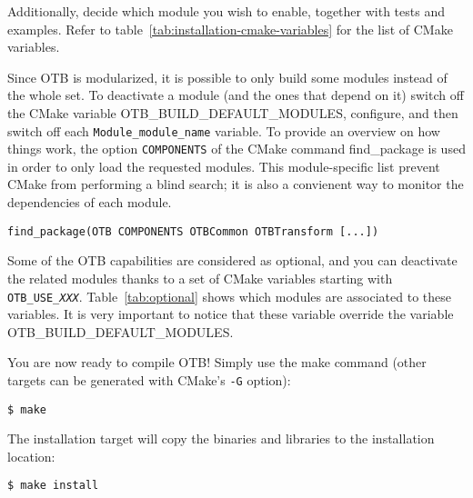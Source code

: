 Additionally, decide which module you wish to enable, together with tests and
examples.  Refer to table~\ref{tab:installation-cmake-variables} for the list of
CMake variables.

Since OTB is modularized, it is possible to only build some modules instead of
the whole set.  To deactivate a module (and the ones that depend on it) switch
off the CMake variable OTB\_BUILD\_DEFAULT\_MODULES, configure, and then switch
off each \texttt{Module\_module\_name} variable.  To provide an overview on how
things work, the option \texttt{COMPONENTS} of the CMake command find\_package
is used in order to only load the requested modules.  This module-specific list
prevent CMake from performing a blind search; it is also a convienent way to
monitor the dependencies of each module.
\begin{verbatim}
find_package(OTB COMPONENTS OTBCommon OTBTransform [...])
\end{verbatim} 

Some of the OTB capabilities are considered as optional, and you can deactivate
the related modules thanks to a set of CMake variables starting
with \texttt{OTB\_USE\_\textit{XXX}}.  Table~\ref{tab:optional} shows which
modules are associated to these variables. It is very important to notice that
these variable override the variable OTB\_BUILD\_DEFAULT\_MODULES.

You are now ready to compile OTB!  Simply use the make command (other targets
can be generated with CMake's \texttt{-G} option):
\begin{verbatim}
$ make
\end{verbatim}

The installation target will copy the binaries and libraries to the installation
location:
\begin{verbatim}
$ make install
\end{verbatim}

